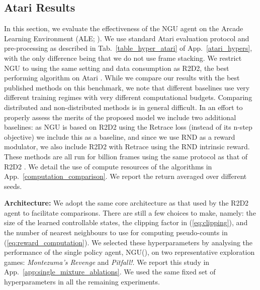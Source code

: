 \documentclass{article} \usepackage{iclr2020_conference,times}
\begin{document}
\subsection{Atari Results}
\label{montezuma_learned}
In this section, we evaluate the effectiveness of the NGU agent on the Arcade Learning Environment (ALE; \citep{bellemare2013arcade}).
We use standard Atari evaluation protocol and pre-processing as described in Tab.~\ref{table_hyper_atari} of App.~\ref{atari_hypers}, with the only difference being that we do not use frame stacking.
We restrict NGU to using the same setting and data consumption as R2D2, the best performing algorithm on Atari \citep{r2d2}.
While we compare our results with the best published methods on this benchmark, we note that different baselines use very different training regimes with very different computational budgets.
Comparing distributed and non-distributed methods is in general difficult.
In an effort to properly assess the merits of the proposed model we include two additional baselines: as NGU is based on R2D2 using the Retrace loss (instead of its n-step objective) we include this as a baseline, and since we use RND as a reward modulator, we also include R2D2 with Retrace using the RND intrinsic reward.
These methods are all run for  billion frames using the same protocol as that of R2D2 \citep{r2d2}.
We detail the use of compute resources of the algorithms in App.~\ref{computation_comparison}. We report the return averaged over  different seeds.

{\bf Architecture:} We adopt the same core architecture as that used by the R2D2 agent to facilitate comparisons. There are still a few choices to make, namely: the size of the learned controllable states, the clipping factor  in (\ref{eq:clipping}), and the number of nearest neighbours to use for computing pseudo-counts in  (\ref{eq:reward_computation}).
We selected these hyperparameters by analysing the performance of the single policy agent, NGU(), on two representative exploration games: \textit{Montezuma's Revenge} and \textit{Pitfall!}. We report this study in App.~\ref{app:single_mixture_ablations}. We used the same fixed set of hyperparameters in all the remaining experiments.
\end{document}

